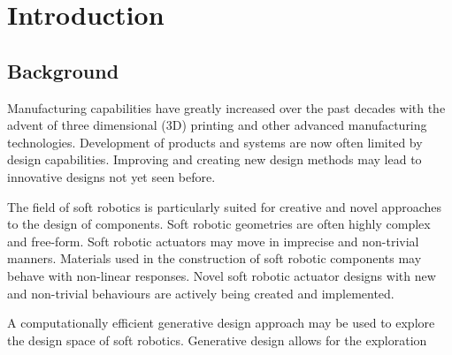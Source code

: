 \chapter{Introduction}
\label{chp:Intro}


\section{Background}

Manufacturing capabilities have greatly increased over the past decades with the advent of three dimensional (3D) printing and other advanced manufacturing technologies. Development of products and systems are now often limited by design capabilities. Improving and creating new design methods may lead to innovative designs not yet seen before.

The field of soft robotics is particularly suited for creative and novel approaches to the design of components. Soft robotic geometries are often highly complex and free-form. Soft robotic actuators may move in imprecise and non-trivial manners. Materials used in the construction of soft robotic components may behave with non-linear responses. Novel soft robotic actuator designs with new and non-trivial behaviours are actively being created and implemented.

A computationally efficient generative design approach may be used to explore the design space of soft robotics. Generative design allows for the exploration 